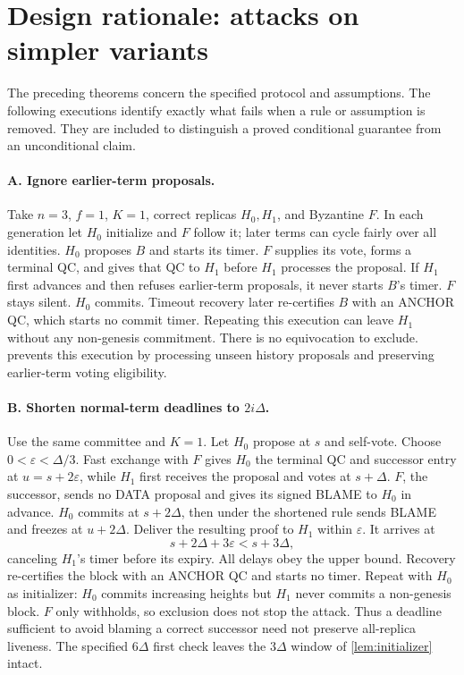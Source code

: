 \documentclass[11pt,a4paper]{article}
\newcounter{protocol}
\begin{document}
\section{Design rationale: attacks on simpler variants}
\label{sec:attacks}
The preceding theorems concern the specified protocol and assumptions.
The following executions identify exactly what fails when a rule or
assumption is removed. They are included to distinguish a proved conditional
guarantee from an unconditional claim.

\paragraph{A. Ignore earlier-term proposals.}
Take $n=3$, $f=1$, $K=1$, correct replicas $H_0,H_1$, and Byzantine $F$.
In each generation let $H_0$ initialize and $F$ follow it; later terms
can cycle fairly over all identities. $H_0$ proposes $B$ and starts its
timer. $F$ supplies its vote, forms a terminal QC, and gives that QC to
$H_1$ before $H_1$ processes the proposal. If $H_1$ first advances and
then refuses earlier-term proposals, it never starts $B$'s timer.
$F$ stays silent. $H_0$ commits. Timeout recovery later
re-certifies $B$ with an ANCHOR QC, which starts no commit
timer.
Repeating this execution can leave $H_1$ without any non-genesis
commitment. There is no equivocation to exclude.
 prevents this execution by processing unseen history
proposals and preserving earlier-term voting eligibility.

\paragraph{B. Shorten normal-term deadlines to $2i\Delta$.}
Use the same committee and $K=1$. Let $H_0$ propose at $s$ and self-vote.
Choose $0<\varepsilon<\Delta/3$. Fast exchange with $F$ gives $H_0$ the
terminal QC and successor entry at $u=s+2\varepsilon$, while $H_1$
first receives the proposal and votes at $s+\Delta$. $F$, the successor,
sends no DATA proposal and gives its signed BLAME to $H_0$ in
advance. $H_0$ commits at $s+2\Delta$, then under the shortened rule sends
BLAME and freezes at $u+2\Delta$. Deliver the resulting proof to $H_1$
within $\varepsilon$. It arrives at
\[
 s+2\Delta+3\varepsilon<s+3\Delta,
\]
canceling $H_1$'s timer before its expiry. All delays obey the upper bound.
Recovery re-certifies the block with an ANCHOR QC and starts no
timer. Repeat with $H_0$ as initializer:
$H_0$ commits increasing heights but $H_1$ never commits a non-genesis
block. $F$ only withholds, so exclusion does not stop the attack.
Thus a deadline sufficient to avoid blaming a correct successor need not
preserve all-replica liveness. The specified $6\Delta$ first check leaves
the $3\Delta$ window of \cref{lem:initializer} intact.
\end{document}
